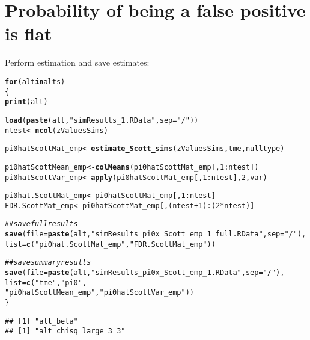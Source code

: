 \documentclass{article}\usepackage[]{graphicx}\usepackage[]{color}
\makeatletter
\newcommand{\hlnum}[1]{\textcolor[rgb]{0.686,0.059,0.569}{#1}}%
\newcommand{\hlstr}[1]{\textcolor[rgb]{0.192,0.494,0.8}{#1}}%
\newcommand{\hlcom}[1]{\textcolor[rgb]{0.678,0.584,0.686}{\textit{#1}}}%
\newcommand{\hlopt}[1]{\textcolor[rgb]{0,0,0}{#1}}%
\newcommand{\hlstd}[1]{\textcolor[rgb]{0.345,0.345,0.345}{#1}}%
\newcommand{\hlkwa}[1]{\textcolor[rgb]{0.161,0.373,0.58}{\textbf{#1}}}%
\newcommand{\hlkwb}[1]{\textcolor[rgb]{0.69,0.353,0.396}{#1}}%
\newcommand{\hlkwc}[1]{\textcolor[rgb]{0.333,0.667,0.333}{#1}}%
\newcommand{\hlkwd}[1]{\textcolor[rgb]{0.737,0.353,0.396}{\textbf{#1}}}%
\newenvironment{kframe}{%
 \def\at@end@of@kframe{}%
 \ifinner\ifhmode%
  \def\at@end@of@kframe{\end{minipage}}%
  \begin{minipage}{\columnwidth}%
 \fi\fi%
 \def\FrameCommand##1{\hskip\@totalleftmargin \hskip-\fboxsep
 \colorbox{shadecolor}{##1}\hskip-\fboxsep
     \hskip-\linewidth \hskip-\@totalleftmargin \hskip\columnwidth}%
 \MakeFramed {\advance\hsize-\width
   \@totalleftmargin\z@ \linewidth\hsize
   \@setminipage}}%
 {\par\unskip\endMakeFramed%
 \at@end@of@kframe}
\newenvironment{knitrout}{}{} %
\makeatother
\begin{document}
\section{Probability of being a false positive is flat}

Perform estimation and save estimates:

\begin{knitrout}
\color{fgcolor}\begin{kframe}
\begin{alltt}
\hlkwa{for}\hlstd{(alt} \hlkwa{in} \hlstd{alts)}
\hlstd{\{}
  \hlkwd{print}\hlstd{(alt)}

  \hlkwd{load}\hlstd{(}\hlkwd{paste}\hlstd{(alt,}\hlstr{"simResults_1.RData"}\hlstd{,}\hlkwc{sep}\hlstd{=}\hlstr{"/"}\hlstd{))}
  \hlstd{ntest} \hlkwb{<-} \hlkwd{ncol}\hlstd{(zValuesSims)}

  \hlstd{pi0hatScottMat_emp} \hlkwb{<-} \hlkwd{estimate_Scott_sims}\hlstd{(zValuesSims, tme, nulltype)}

  \hlstd{pi0hatScottMean_emp} \hlkwb{<-} \hlkwd{colMeans}\hlstd{(pi0hatScottMat_emp[,}\hlnum{1}\hlopt{:}\hlstd{ntest])}
  \hlstd{pi0hatScottVar_emp} \hlkwb{<-} \hlkwd{apply}\hlstd{(pi0hatScottMat_emp[,}\hlnum{1}\hlopt{:}\hlstd{ntest],}\hlnum{2}\hlstd{,var)}

  \hlstd{pi0hat.ScottMat_emp} \hlkwb{<-} \hlstd{pi0hatScottMat_emp[,}\hlnum{1}\hlopt{:}\hlstd{ntest]}
  \hlstd{FDR.ScottMat_emp} \hlkwb{<-} \hlstd{pi0hatScottMat_emp[,(ntest}\hlopt{+}\hlnum{1}\hlstd{)}\hlopt{:}\hlstd{(}\hlnum{2}\hlopt{*}\hlstd{ntest)]}

  \hlcom{##save full results}
  \hlkwd{save}\hlstd{(}\hlkwc{file}\hlstd{=}\hlkwd{paste}\hlstd{(alt,}\hlstr{"simResults_pi0x_Scott_emp_1_full.RData"}\hlstd{,}\hlkwc{sep}\hlstd{=}\hlstr{"/"}\hlstd{),}
       \hlkwc{list}\hlstd{=}\hlkwd{c}\hlstd{(}\hlstr{"pi0hat.ScottMat_emp"}\hlstd{,} \hlstr{"FDR.ScottMat_emp"}\hlstd{))}

  \hlcom{##save summary results}
  \hlkwd{save}\hlstd{(}\hlkwc{file}\hlstd{=}\hlkwd{paste}\hlstd{(alt,}\hlstr{"simResults_pi0x_Scott_emp_1.RData"}\hlstd{,}\hlkwc{sep}\hlstd{=}\hlstr{"/"}\hlstd{),}
       \hlkwc{list}\hlstd{=}\hlkwd{c}\hlstd{(}\hlstr{"tme"}\hlstd{,} \hlstr{"pi0"}\hlstd{,}
            \hlstr{"pi0hatScottMean_emp"}\hlstd{,}\hlstr{"pi0hatScottVar_emp"}\hlstd{))}
\hlstd{\}}
\end{alltt}
\begin{verbatim}
## [1] "alt_beta"
## [1] "alt_chisq_large_3_3"
\end{verbatim}



\end{kframe}
\end{knitrout}
\end{document}
